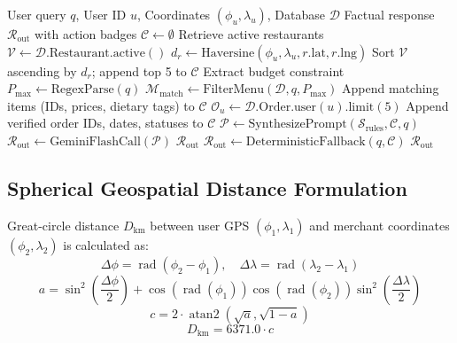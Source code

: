 \documentclass[conference]{IEEEtran}
\begin{document}
\begin{algorithmic}[1]
\REQUIRE User query $q$, User ID $u$, Coordinates $(\phi_u, \lambda_u)$, Database $\mathcal{D}$
\ENSURE Factual response $\mathcal{R}_{\text{out}}$ with action badges
\STATE $\mathcal{C} \leftarrow \emptyset$ 
    \STATE Retrieve active restaurants $\mathcal{V} \leftarrow \mathcal{D}.\text{Restaurant}.\text{active}()$
        \STATE $d_r \leftarrow \text{Haversine}(\phi_u, \lambda_u, r.\text{lat}, r.\text{lng})$
    \ENDFOR
    \STATE Sort $\mathcal{V}$ ascending by $d_r$; append top 5 to $\mathcal{C}$
\ENDIF
\STATE Extract budget constraint $P_{\max} \leftarrow \text{RegexParse}(q)$
\STATE $\mathcal{M}_{\text{match}} \leftarrow \text{FilterMenu}(\mathcal{D}, q, P_{\max})$
\STATE Append matching items (IDs, prices, dietary tags) to $\mathcal{C}$
    \STATE $\mathcal{O}_u \leftarrow \mathcal{D}.\text{Order}.\text{user}(u).\text{limit}(5)$
    \STATE Append verified order IDs, dates, statuses to $\mathcal{C}$
\ENDIF
{}
    \STATE $\mathcal{P} \leftarrow \text{SynthesizePrompt}(\mathcal{S}_{\text{rules}}, \mathcal{C}, q)$
    \STATE $\mathcal{R}_{\text{out}} \leftarrow \text{GeminiFlashCall}(\mathcal{P})$
        \RETURN $\mathcal{R}_{\text{out}}$
    \ENDIF
\ENDIF
\STATE {}
\STATE $\mathcal{R}_{\text{out}} \leftarrow \text{DeterministicFallback}(q, \mathcal{C})$
\RETURN $\mathcal{R}_{\text{out}}$
\end{algorithmic}

\subsection{Spherical Geospatial Distance Formulation}
Great-circle distance $D_{\text{km}}$ between user GPS $(\phi_1, \lambda_1)$ and merchant coordinates $(\phi_2, \lambda_2)$ is calculated as:
\begin{equation}
\Delta \phi = \operatorname{rad}(\phi_2 - \phi_1), \quad \Delta \lambda = \operatorname{rad}(\lambda_2 - \lambda_1)
\end{equation}
\begin{equation}
a = \sin^2\left(\frac{\Delta \phi}{2}\right) + \cos(\operatorname{rad}(\phi_1))\cos(\operatorname{rad}(\phi_2))\sin^2\left(\frac{\Delta \lambda}{2}\right)
\end{equation}
\begin{equation}
c = 2 \cdot \operatorname{atan2}\left(\sqrt{a}, \sqrt{1 - a}\right)
\end{equation}
\begin{equation}
D_{\text{km}} = 6371.0 \cdot c
\end{equation}
\end{document}
